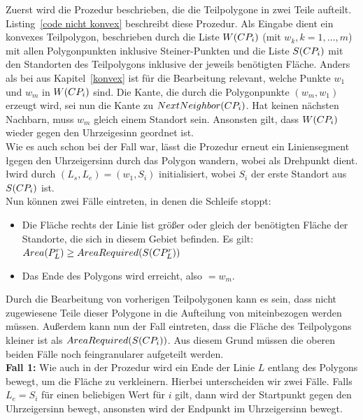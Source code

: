 \documentclass[ngerman]{seminarbeitrag}
\begin{document}
Zuerst wird die Prozedur \noncon beschrieben, die die Teilpolygone in zwei Teile aufteilt. Listing~\ref{code nicht konvex} beschreibt diese Prozedur.
Als Eingabe dient ein konvexes Teilpolygon, beschrieben durch die Liste $W(CP_{i})$ (mit $w_{k}, k = 1,…,m$) mit allen Polygonpunkten inklusive Steiner-Punkten und die Liste $S(CP_{i})$ mit den Standorten des Teilpolygons inklusive der jeweils benötigten Fläche.
Anders als bei \con aus Kapitel~\ref{konvex} ist für die Bearbeitung relevant, welche Punkte $w_{1}$ und $w_{m}$ in $W(CP_{i})$ sind. Die Kante, die durch die Polygonpunkte $(w_{m}, w_{1})$ erzeugt wird, sei nun die Kante zu $NextNeighbor(CP_{i})$. Hat \cpi keinen nächsten Nachbarn, muss $w_{m}$ gleich einem Standort sein. Ansonsten gilt, dass $W(CP_{i})$ wieder gegen den Uhrzeigesinn geordnet ist.\\

Wie es auch schon bei \con der Fall war, lässt die Prozedur erneut ein Liniensegment \l gegen den Uhrzeigersinn durch das Polygon \cpi wandern, wobei \ls als Drehpunkt dient. \l wird durch $(L_{s}, L_{e}) = (w_{1}, S_{i})$ initialisiert, wobei $S_{i}$ der erste Standort aus $S(CP_{i})$ ist.\\
Nun können zwei Fälle eintreten, in denen die Schleife stoppt:

\begin{itemize}
\item Die Fläche rechts der Linie \l ist größer oder gleich der benötigten Fläche der Standorte, die sich in diesem Gebiet befinden. Es gilt:
$Area(P_{L}^{r})\ge AreaRequired(S(CP_{L}^{r}))$
\item Das Ende des Polygons wird erreicht, also \Le $= w_{m}$.
\end{itemize}

Durch die Bearbeitung von vorherigen Teilpolygonen kann es sein, dass nicht zugewiesene Teile dieser Polygone in die Aufteilung von \cpi miteinbezogen werden müssen. Außerdem kann nun der Fall eintreten, dass die Fläche des Teilpolygons kleiner ist als $AreaRequired(S(CP_{i}))$. Aus diesem Grund müssen die oberen beiden Fälle noch feingranularer aufgeteilt werden.\\

\textbf{Fall 1:} Wie auch in der Prozedur \con wird ein Ende der Linie $L$ entlang des Polygons bewegt, um die Fläche \ar{\mprl}zu verkleinern. Hierbei unterscheiden wir zwei Fälle. Falls $L_{e} = S_{i}$ für einen beliebigen Wert für $i$ gilt, dann wird der Startpunkt \ls gegen den Uhrzeigersinn bewegt, ansonsten wird der Endpunkt \Le im Uhrzeigersinn bewegt.
\end{document}
